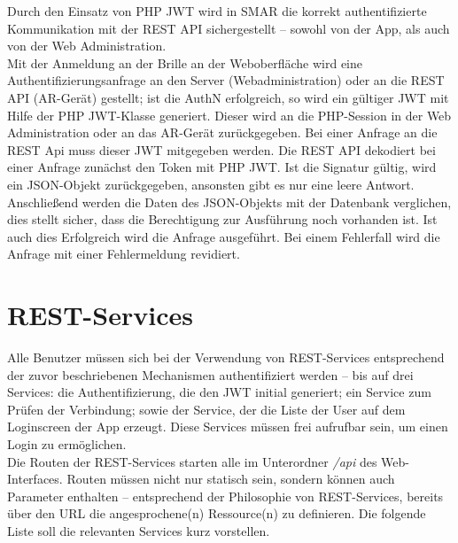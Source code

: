 Durch den Einsatz von PHP JWT wird in \ac{SMAR} die korrekt authentifizierte Kommunikation mit der \acs{REST} \acs{API} sichergestellt -- sowohl von der App, als auch von der Web Administration.\\
Mit der Anmeldung an der Brille \bzw an der Weboberfläche wird eine Authentifizierungsanfrage an den Server (Webadministration) oder an die \acs{REST} \acs{API} (\acs{AR}-Gerät) gestellt; ist die \acl{AuthN} erfolgreich, so wird ein gültiger \ac{JWT} mit Hilfe der PHP JWT-Klasse generiert. Dieser wird an die PHP-Session in der Web Administration oder an das \acs{AR}-Gerät zurückgegeben. Bei einer Anfrage an die REST Api muss dieser \acs{JWT} mitgegeben werden. Die \acs{REST} \acs{API} dekodiert bei einer Anfrage zunächst den Token mit PHP JWT. Ist die Signatur gültig, wird ein \acs{JSON}-Objekt zurückgegeben, ansonsten gibt es nur eine leere Antwort. Anschließend werden die Daten des \acs{JSON}-Objekts mit der Datenbank verglichen, dies stellt sicher, dass die Berechtigung zur Ausführung noch vorhanden ist. Ist auch dies Erfolgreich wird die Anfrage ausgeführt. Bei einem Fehlerfall wird die Anfrage mit einer Fehlermeldung revidiert.

\section{REST-Services}
Alle Benutzer müssen sich bei der Verwendung von REST-Services entsprechend der zuvor beschriebenen Mechanismen authentifiziert werden -- bis auf drei Services: die Authentifizierung, die den \acs{JWT} initial generiert; ein Service zum Prüfen der Verbindung; sowie der Service, der die Liste der User auf dem Loginscreen der App erzeugt. Diese Services müssen frei aufrufbar sein, um einen Login zu ermöglichen.\\
Die Routen der \acs{REST}-Services starten alle im Unterordner \emph{/api} des Web-Interfaces. Routen müssen nicht nur statisch sein, sondern können auch Parameter enthalten -- entsprechend der Philosophie von \acs{REST}-Services, bereits über den \acs{URL} die angesprochene(n) Ressource(n) zu definieren. Die folgende Liste soll die relevanten Services kurz vorstellen.

